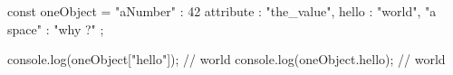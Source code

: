 const oneObject = {
    "aNumber" : 42
    attribute : "the_value",
    hello : "world",
    "a space" : "why ?"
};

console.log(oneObject["hello"]); // world
console.log(oneObject.hello); // world
